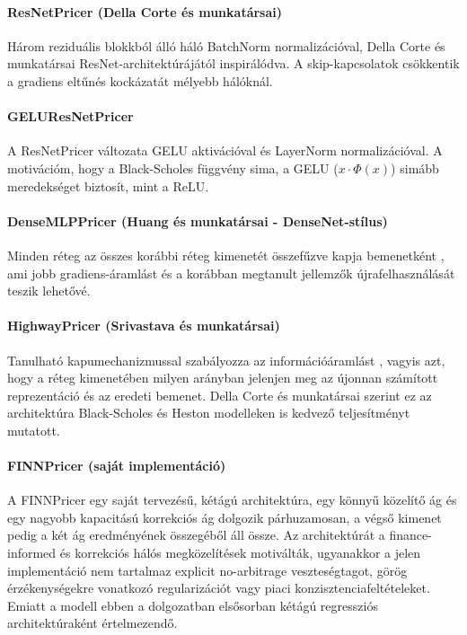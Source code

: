 \paragraph{ResNetPricer (Della Corte és munkatársai)}
Három reziduális blokkból álló háló BatchNorm normalizációval, Della Corte és munkatársai \cite{dellacorte2023} ResNet-architektúrájától inspirálódva.
A skip-kapcsolatok csökkentik a gradiens eltűnés kockázatát mélyebb hálóknál.

\paragraph{GELUResNetPricer}
A ResNetPricer változata GELU aktivációval és LayerNorm normalizációval.
A motivációm, hogy a Black-Scholes függvény sima, a GELU ($x \cdot \Phi(x)$)
simább meredekséget biztosít, mint a ReLU.

\paragraph{DenseMLPPricer (Huang és munkatársai - DenseNet-stílus)}
Minden réteg az összes korábbi réteg kimenetét összefűzve kapja bemenetként \cite{huang2017}, ami jobb gradiens-áramlást és a korábban megtanult jellemzők újrafelhasználását teszik lehetővé.

\paragraph{HighwayPricer (Srivastava és munkatársai)}
Tanulható kapumechanizmussal szabályozza az információáramlást \cite{srivastava2015}, vagyis azt, hogy a réteg kimenetében milyen arányban jelenjen meg az újonnan számított reprezentáció és az eredeti bemenet. Della Corte és munkatársai \cite{dellacorte2023} szerint ez az architektúra Black-Scholes és Heston modelleken is kedvező teljesítményt mutatott.

\paragraph{FINNPricer (saját implementáció)}
A FINNPricer egy saját tervezésű, kétágú architektúra, egy könnyű közelítő ág és egy nagyobb kapacitású korrekciós ág dolgozik párhuzamosan, a végső kimenet pedig a két ág eredményének összegéből áll össze. Az architektúrát a finance-informed és korrekciós hálós megközelítések motiválták, ugyanakkor a jelen implementáció nem tartalmaz explicit no-arbitrage veszteségtagot, görög érzékenységekre vonatkozó regularizációt vagy piaci konzisztenciafeltételeket. Emiatt a modell ebben a dolgozatban elsősorban kétágú regressziós architektúraként értelmezendő.

